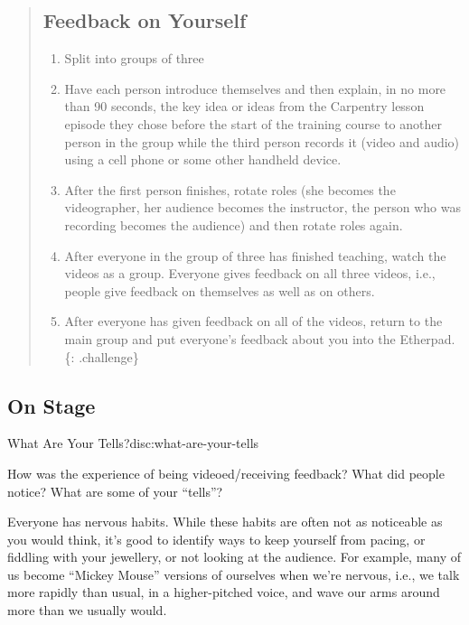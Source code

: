 \begin{quote}
\subsection{Feedback on Yourself}\label{feedback-on-yourself}

\begin{enumerate}
\def\labelenumi{\arabic{enumi}.}
\itemsep1pt\parskip0pt
\item
  Split into groups of three
\item
  Have each person introduce themselves and then explain, in no more
  than 90 seconds, the key idea or ideas from the Carpentry lesson
  episode they chose before the start of the training course to another
  person in the group while the third person records it (video and
  audio) using a cell phone or some other handheld device.
\item
  After the first person finishes, rotate roles (she becomes the
  videographer, her audience becomes the instructor, the person who was
  recording becomes the audience) and then rotate roles again.
\item
  After everyone in the group of three has finished teaching, watch the
  videos as a group. Everyone gives feedback on all three videos, i.e.,
  people give feedback on themselves as well as on others.
\item
  After everyone has given feedback on all of the videos, return to the
  main group and put everyone's feedback about you into the Etherpad.
  \{: .challenge\}
\end{enumerate}
\end{quote}

\subsection{On Stage}\label{on-stage}

\begin{discussion}{What Are Your Tells?}{disc:what-are-your-tells}

How was the experience of being videoed/receiving feedback? What did
people notice? What are some of your ``tells''?
\end{discussion}

Everyone has nervous habits. While these habits are often not as
noticeable as you would think, it's good to identify ways to keep
yourself from pacing, or fiddling with your jewellery, or not looking at
the audience. For example, many of us become ``Mickey Mouse'' versions
of ourselves when we're nervous, i.e., we talk more rapidly than usual,
in a higher-pitched voice, and wave our arms around more than we usually
would.

